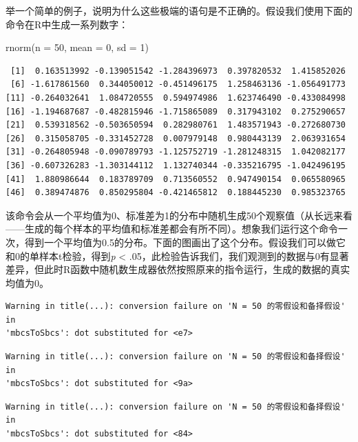 \documentclass[
  letterpaper,
  DIV=11,
  numbers=noendperiod]{scrreprt}
\newenvironment{Shaded}{\begin{snugshade}}{\end{snugshade}}
\newcommand{\AttributeTok}[1]{\textcolor[rgb]{0.40,0.45,0.13}{#1}}
\newcommand{\DecValTok}[1]{\textcolor[rgb]{0.68,0.00,0.00}{#1}}
\newcommand{\FunctionTok}[1]{\textcolor[rgb]{0.28,0.35,0.67}{#1}}
\newcommand{\NormalTok}[1]{\textcolor[rgb]{0.00,0.23,0.31}{#1}}
\begin{document}
举一个简单的例子，说明为什么这些极端的语句是不正确的。假设我们使用下面的命令在R中生成一系列数字：

\begin{Shaded}
\begin{Highlighting}[]
\FunctionTok{rnorm}\NormalTok{(}\AttributeTok{n =} \DecValTok{50}\NormalTok{, }\AttributeTok{mean =} \DecValTok{0}\NormalTok{, }\AttributeTok{sd =} \DecValTok{1}\NormalTok{)}
\end{Highlighting}
\end{Shaded}

\begin{verbatim}
 [1]  0.163513992 -0.139051542 -1.284396973  0.397820532  1.415852026
 [6] -1.617861560  0.344050012 -0.451496175  1.258463136 -1.056491773
[11] -0.264032641  1.084720555  0.594974986  1.623746490 -0.433084998
[16] -1.194687687 -0.482815946 -1.715865089  0.317943102  0.275290657
[21]  0.539318562 -0.503650594  0.282980761  1.483571943 -0.272680730
[26]  0.315058705 -0.331452728  0.007979148  0.980443139  2.063931654
[31] -0.264805948 -0.090789793 -1.125752719 -1.281248315  1.042082177
[36] -0.607326283 -1.303144112  1.132740344 -0.335216795 -1.042496195
[41]  1.880986644  0.183789709  0.713560552  0.947490154  0.065580965
[46]  0.389474876  0.850295804 -0.421465812  0.188445230  0.985323765
\end{verbatim}

该命令会从一个平均值为0、标准差为1的分布中随机生成50个观察值（从长远来看------生成的每个样本的平均值和标准差都会有所不同）。想象我们运行这个命令一次，得到一个平均值为0.5的分布。下面的图画出了这个分布。假设我们可以做它和0的单样本t检验，得到\emph{p}
\textless{}
.05，此检验告诉我们，我们观测到的数据与0有显著差异，但此时R函数中随机数生成器依然按照原来的指令运行，生成的数据的真实均值为0。

\begin{verbatim}
Warning in title(...): conversion failure on 'N = 50 的零假设和备择假设' in
'mbcsToSbcs': dot substituted for <e7>
\end{verbatim}

\begin{verbatim}
Warning in title(...): conversion failure on 'N = 50 的零假设和备择假设' in
'mbcsToSbcs': dot substituted for <9a>
\end{verbatim}

\begin{verbatim}
Warning in title(...): conversion failure on 'N = 50 的零假设和备择假设' in
'mbcsToSbcs': dot substituted for <84>
\end{verbatim}
\end{document}
